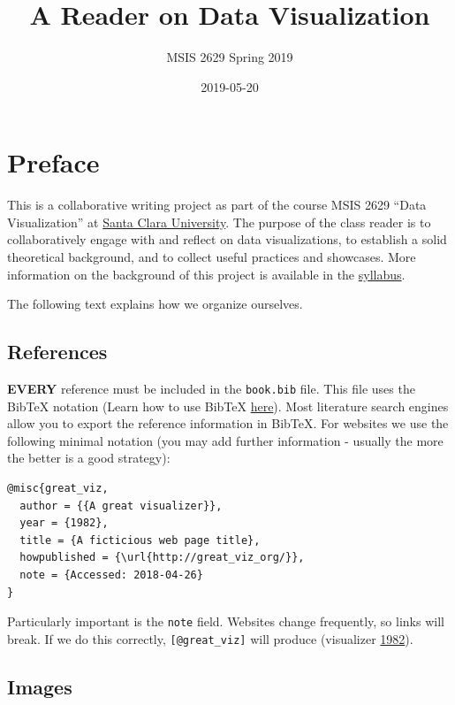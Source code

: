 \documentclass[]{book}
\title{A Reader on Data Visualization}
\author{MSIS 2629 Spring 2019}
\date{2019-05-20}
\begin{document}
\maketitle

{
\setcounter{tocdepth}{1}
\tableofcontents
}
\hypertarget{preface}{%
\chapter{Preface}\label{preface}}

This is a collaborative writing project as part of the course MSIS 2629 ``Data Visualization'' at \href{http://www.scu.edu}{Santa Clara University}. The purpose of the class reader is to collaboratively engage with and reflect on data visualizations, to establish a solid theoretical background, and to collect useful practices and showcases. More information on the background of this project is available in the \href{https://mschermann.github.io/msis2629spring2019}{syllabus}.

The following text explains how we organize ourselves.

\hypertarget{references}{%
\section{References}\label{references}}

\textbf{EVERY} reference must be included in the \texttt{book.bib} file. This file uses the BibTeX notation (Learn how to use BibTeX \href{http://www.bibtex.org/Using/}{here}). Most literature search engines allow you to export the reference information in BibTeX. For websites we use the following minimal notation (you may add further information - usually the more the better is a good strategy):

\begin{verbatim}
@misc{great_viz,
  author = {{A great visualizer}},
  year = {1982},
  title = {A ficticious web page title},
  howpublished = {\url{http://great_viz_org/}},
  note = {Accessed: 2018-04-26}
}
\end{verbatim}

Particularly important is the \texttt{note} field. Websites change frequently, so links will break. If we do this correctly, \texttt{{[}@great\_viz{]}} will produce (visualizer \protect\hyperlink{ref-great_viz}{1982}).

\hypertarget{images}{%
\section{Images}\label{images}}
\end{document}
